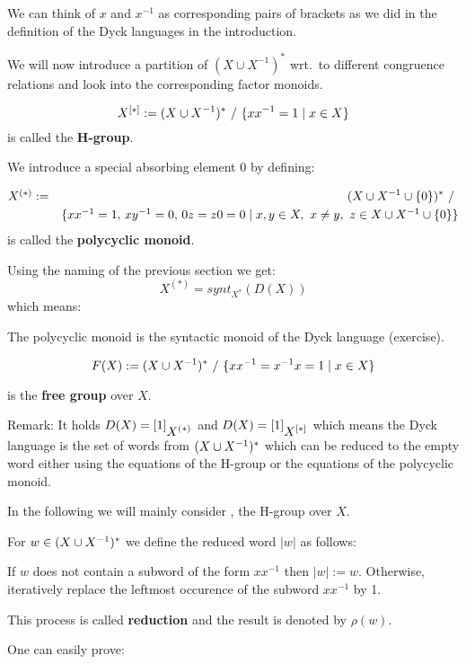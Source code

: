 We can think of $x$ and $x^{-1}$ as corresponding pairs of
brackets as we did in the definition of the Dyck languages in the introduction.

We will now introduce a partition of $(X \cup X^{-1})^*$ wrt.\ to
different congruence relations and look into the corresponding factor monoids.

\begin{definition}
\[ \mbox{${X}^{[*]}$} := (X \cup {X}^{-1})^*\ /\ \{ x x^{-1} = 1 \mid x \in X \} \] is
called the {\bf H-group}.
\end{definition}

We introduce a special absorbing element $0$ by defining:
\begin{definition}
\begin{eqnarray*}
\mbox{${X}^{(*)}$} & := & (X \cup {X}^{-1} \cup \mbox{$\{0\}$})^*\ /\ \\
& & \mbox{$\{x x^{-1} = 1,\,x y^{-1} = 0,\,0 z = z 0 = 0 \mid x,y \in X,\ x\neq
y,\ z \in X \cup {X}^{-1} \cup \mbox{$\{0\}$}\}$}
\end{eqnarray*}
is called the {\bf polycyclic monoid}.
\end{definition}

Using the naming of the previous section we get:
\[ X^{(*)} = synt_{X^*}(D(X)) \]
which means:

The polycyclic monoid is the syntactic monoid of the Dyck language (exercise).

\begin{definition}
\[ F(X) := (X \cup {X}^{-1})^*\ /\ \{ x x^{-1} = x^{-1} x = 1 \mid x \in X \} \]
\end{definition}
is the {\bf free group} over $X$.

Remark: It holds $D(X) = [1]_{\mbox{${X}^{(*)}$}}$ and $D(X) = [1]_{\mbox{${X}^{[*]}$}}$ which
means the Dyck language is the set of words from $(X \cup {X}^{-1})^*$ which can be
reduced to the empty word either using the equations of the H-group or the
equations of the polycyclic monoid.

In the following we will mainly consider , the H-group over $X$.

For $w \in (X \cup {X}^{-1})^*$ we define the reduced word $|w|$ as follows: 

If $w$ does not contain a subword of the form $x x^{-1}$ then $|w| := w$.
Otherwise, iteratively replace the leftmost occurence of the subword $x
x^{-1}$ by 1.

This process is called {\bf reduction} and the result is denoted by $\rho(w)$.

One can easily prove:

